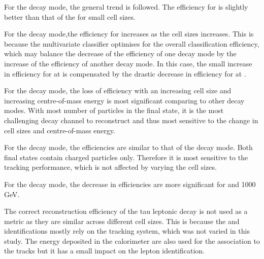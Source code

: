 For the \decayPionShort decay mode, the general trend is followed. The efficiency for  is slightly better than that of the  for small cell sizes.

For the \decayRhoShort decay mode,the efficiency for   increases as the cell sizes increases. This is because the multivariate classifier optimises for the overall classification efficiency, which may balance the decrease of the efficiency of one decay mode by the increase of the efficiency of another decay mode. In this case, the small increase in efficiency for \decayRhoShort at  is compensated by the drastic decrease in efficiency for \decayAiPhotonShort at  .

For the \decayAiPhotonShort decay mode, the loss of efficiency with an increasing \ECAL  cell size and increasing centre-of-mass energy is most significant comparing to other decay modes. With most number of particles in the final state, it is the most challenging decay channel to reconstruct and thus most sensitive to the change in cell sizes and centre-of-mass energy.

For the \decayAiPionShort decay mode, the efficiencies are similar to that of the \decayPionShort decay mode. Both final states contain charged particles only. Therefore it is most sensitive to the tracking performance, which is not affected by varying the \ECAL cell sizes.

For the \decayThreePionPhotonShort decay mode, the decrease in efficiencies are more significant for  and 1000\,GeV.

The   correct reconstruction efficiency of the tau leptonic decay is not used as a metric as they are similar across different \ECAL cell sizes. This is because the \Pepm and \Pgmpm identifications mostly rely on the tracking system, which was not varied in this study. The energy deposited in the calorimeter are also used for the association to the tracks but it has a small impact on the lepton identification.







